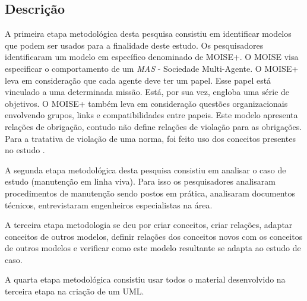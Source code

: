\documentclass[a0,portrait]{a0poster}
\begin{document}
\begin{multicols}{2} %

\color{Navy} %



\color{SaddleBrown} %


\color{} %


\section*{Descrição}

A primeira etapa metodológica desta pesquisa consistiu em identificar modelos que podem ser
usados para a finalidade deste estudo. Os pesquisadores identificaram um modelo em específico 
denominado de MOISE+\cite{AutonomousAgent}. O MOISE visa especificar o comportamento de um 
\textit{MAS} - Sociedade Multi-Agente. O MOISE+ leva em consideração que cada agente deve ter
um papel. Esse papel está vinculado a uma determinada missão. Está, por sua vez, engloba 
uma série de objetivos. O MOISE+ também leva em consideração questões organizacionais envolvendo
grupos, links e compatibilidades entre papeis. Este modelo apresenta relações de obrigação,
contudo não define relações de violação para as obrigações. Para a tratativa de violação de uma
norma, foi feito uso dos conceitos presentes no estudo \cite{ControllingNonNormative}.

A segunda etapa metodológica desta pesquisa consistiu em analisar o caso de estudo (manutenção em linha viva).
Para isso os pesquisadores analisaram procedimentos de manutenção sendo postos em prática, analisaram 
documentos técnicos, entrevistaram engenheiros especialistas na área. 

A terceira etapa metodologia se deu por criar conceitos, criar relações, adaptar conceitos de outros modelos, 
definir relações dos conceitos novos com os conceitos de outros modelos e verificar como este modelo resultante
se adapta ao estudo de caso.

A quarta etapa metodológica consistiu usar todos o material desenvolvido na terceira etapa na criação 
de um UML.


\end{multicols}
\end{document}
